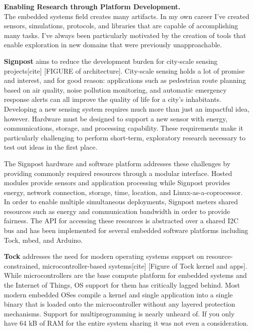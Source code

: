 \documentclass[12pt]{article} %
\begin{document}
\textbf{\textsf{\large Enabling Research through Platform Development.}}\\
The embedded systems field creates many artifacts. In my own career I've
created sensors, simulations, protocols, and libraries that are capable of
accomplishing many tasks. I've always been particularly motivated by the
creation of tools that enable exploration in new domains that were previously
unapproachable.

\textbf{Signpost} aims to reduce the development burden for city-scale sensing
projects[cite] [FIGURE of architecture]. City-scale sensing holds a lot of
promise and interest, and for good reason: applications such as pedestrian
route planning based on air quality, noise pollution monitoring, and automatic
emergency response alerts can all improve the quality of life for a city's
inhabitants. Developing a new sensing system requires much more than just an
impactful idea, however. Hardware must be designed to support a new sensor with
energy, communications, storage, and processing capability. These requirements
make it particularly challenging to perform short-term, exploratory research
necessary to test out ideas in the first place.

The Signpost hardware and software platform addresses these challenges by
providing commonly required resources through a modular interface. Hosted
modules provide sensors and application processing while Signpost provides
energy, network connection, storage, time, location, and
Linux-as-a-coprocessor. In order to enable multiple simultaneous deployments,
Signpost meters shared resources such as energy and communication bandwidth in
order to provide fairness. The API for accessing these resources is abstracted
over a shared I2C bus and has been implemented for several embedded software
platforms including Tock, mbed, and Arduino.

\textbf{Tock} addresses the need for modern operating systems support on
resource-constrained, microcontroller-based systems[cite] [Figure of Tock
kernel and apps]. While microcontrollers are the base compute platform for
embedded systems and the Internet of Things, OS support for them has critically
lagged behind. Most modern embedded OSes compile a kernel and single
application into a single binary that is loaded onto the microcontroller
without any layered protection mechanisms. Support for multiprogramming is
nearly unheard of. If you only have 64 kB of RAM for the entire system sharing
it was not even a consideration.
\end{document}
